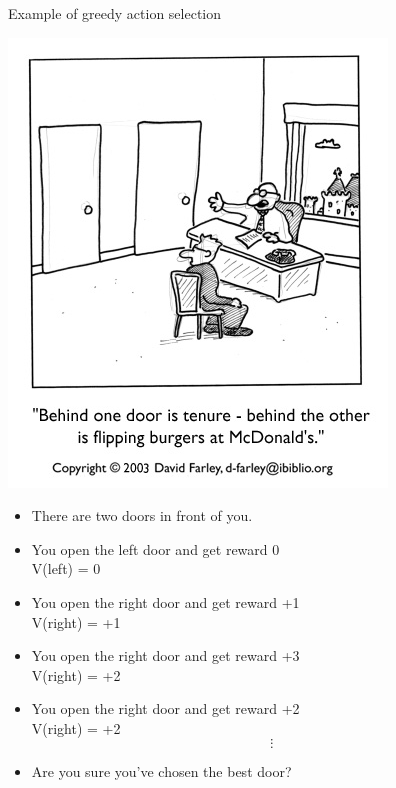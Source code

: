 \bgroup
\begin{frame}{Example of greedy action selection}
\begin{minipage}{0.4\textwidth}
\includegraphics[width=\textwidth]{img/doors.jpg}
\end{minipage}
\begin{minipage}{0.55\textwidth}
\begin{itemize}
\item There are two doors in front of you.
\item You open the left door and get reward 0\\
\textcolor{mImagelabRed}{V(left) = 0}
\item You open the right door and get reward +1\\
\textcolor{mImagelabRed}{V(right) = +1}
\item You open the right door and get reward +3\\
\textcolor{mImagelabRed}{V(right) = +2}
\item You open the right door and get reward +2\\
\textcolor{mImagelabRed}{V(right) = +2}
\begin{equation*}
\vdots
\end{equation*}
\item Are you sure you've chosen the best door?
\end{itemize}
\end{minipage}
\end{frame}
\egroup